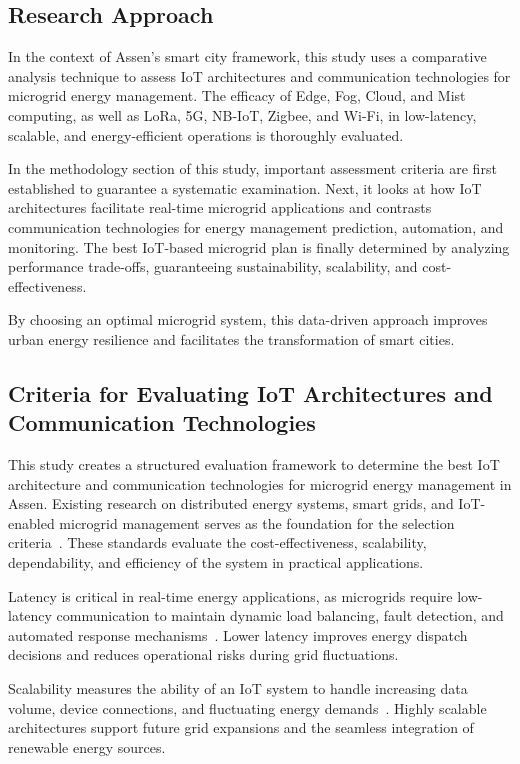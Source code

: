 \documentclass[conference]{IEEEtran}
\begin{document}
\subsection{Research Approach}

In the context of Assen's smart city framework, this study uses a comparative analysis technique to assess IoT architectures and communication technologies for microgrid energy management. The efficacy of Edge, Fog, Cloud, and Mist computing, as well as LoRa, 5G, NB-IoT, Zigbee, and Wi-Fi, in low-latency, scalable, and energy-efficient operations is thoroughly evaluated.

In the methodology section of this study, important assessment criteria are first established to guarantee a systematic examination. Next, it looks at how IoT architectures facilitate real-time microgrid applications and contrasts communication technologies for energy management prediction, automation, and monitoring. The best IoT-based microgrid plan is finally determined by analyzing performance trade-offs, guaranteeing sustainability, scalability, and cost-effectiveness.

By choosing an optimal microgrid system, this data-driven approach improves urban energy resilience and facilitates the transformation of smart cities. 


\subsection{Criteria for Evaluating IoT Architectures and Communication Technologies}

This study creates a structured evaluation framework to determine the best IoT architecture and communication technologies for microgrid energy management in Assen. Existing research on distributed energy systems, smart grids, and IoT-enabled microgrid management serves as the foundation for the selection criteria~\cite{en14185976, 10474733}. These standards evaluate the cost-effectiveness, scalability, dependability, and efficiency of the system in practical applications.

Latency is critical in real-time energy applications, as microgrids require low-latency communication to maintain dynamic load balancing, fault detection, and automated response mechanisms~\cite{9584756}. Lower latency improves energy dispatch decisions and reduces operational risks during grid fluctuations.

Scalability measures the ability of an IoT system to handle increasing data volume, device connections, and fluctuating energy demands~\cite{9257923}. Highly scalable architectures support future grid expansions and the seamless integration of renewable energy sources.
\end{document}
